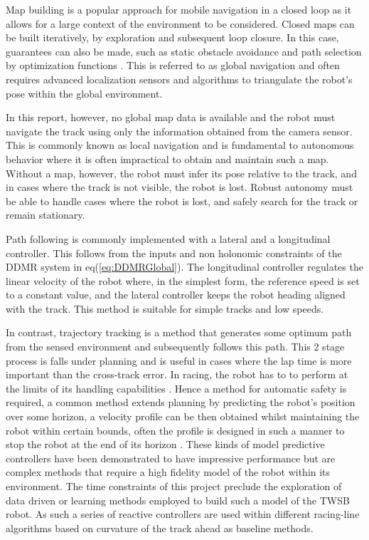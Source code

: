         Map building is a popular approach for mobile navigation in a closed loop as it allows for a large 
        context of the environment to be considered. Closed maps can be built iteratively, by exploration 
        and subsequent loop closure. In this case, guarantees can also be made, 
        such as static obstacle avoidance and path selection by optimization functions \cite{Macenski_2020}. 
        This is referred to as global navigation and often requires advanced localization sensors 
        and algorithms to triangulate the robot's pose within the global environment.
        
        In this report, however, no global map data is available and the robot must navigate 
        the track using only the information obtained from the camera sensor. This is commonly known as local navigation
        and is fundamental to autonomous behavior where it is often impractical to obtain and maintain such a map. Without a map, 
        however, the robot must infer its pose relative to the track, and in cases where the track is not visible, the robot is lost. 
        Robust autonomy must be able to handle cases where the robot is lost, and safely search for the track or remain stationary. 

        Path following is commonly implemented with a lateral and a longitudinal controller. This follows from the 
        inputs and non holonomic constraints of the DDMR system in eq(\ref{eq:DDMRGlobal}).
        The longitudinal controller regulates the linear velocity of the robot where, in the simplest form, the reference speed 
        is set to a constant value, and the lateral controller keeps the robot heading aligned with the track. 
        This method is suitable for simple tracks and low speeds.
        
        In contrast, trajectory tracking is a method that generates some optimum path from the sensed environment and subsequently follows this path.
        This 2 stage process is falls under planning and is useful in cases where the lap time is more important than the cross-track error.
        In racing, the robot has to to perform at the limits of its handling capabilities \cite{wischnewski2022indy}. Hence a method 
        for automatic safety is required, a common method extends planning by predicting the robot's position over some horizon,
        a velocity profile can be then obtained whilst maintaining the robot within certain bounds, often the profile is 
        designed in such a manner to stop the robot at the end of its horizon \cite{williams2016aggressive}. These kinds of model predictive controllers 
        have been demonstrated to have impressive performance but are complex methods that require a high fidelity model of the robot within its environment. 
        The time constraints of this project preclude the exploration of data driven 
        or learning methods employed to build such a model of the TWSB robot. As such a series of reactive controllers are used within different 
        racing-line algorithms based on curvature of the track ahead as baseline methods.
            
